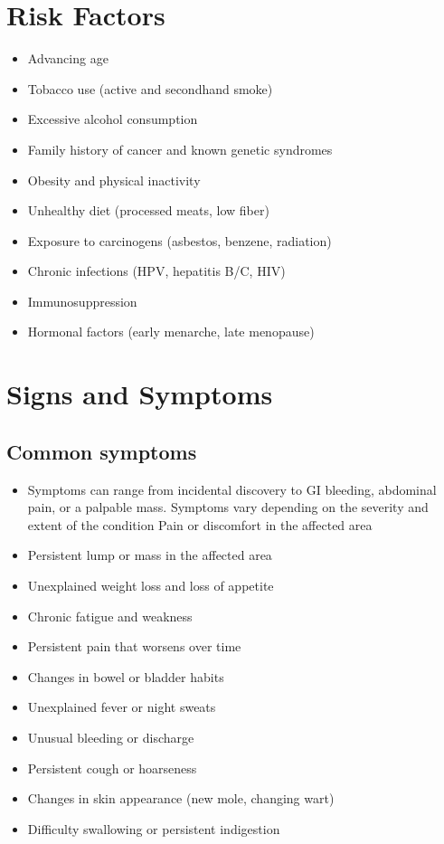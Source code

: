 \section{Risk Factors}

\begin{itemize}[noitemsep]
  \item Advancing age
  \item Tobacco use (active and secondhand smoke)
  \item Excessive alcohol consumption
  \item Family history of cancer and known genetic syndromes
  \item Obesity and physical inactivity
  \item Unhealthy diet (processed meats, low fiber)
  \item Exposure to carcinogens (asbestos, benzene, radiation)
  \item Chronic infections (HPV, hepatitis B/C, HIV)
  \item Immunosuppression
  \item Hormonal factors (early menarche, late menopause)
\end{itemize}
\section{Signs and Symptoms}

\subsection{Common symptoms}
\begin{itemize}[noitemsep]
  \item Symptoms can range from incidental discovery to GI bleeding, abdominal pain, or a palpable mass. Symptoms vary depending on the severity and extent of the condition Pain or discomfort in the affected area
  \item Persistent lump or mass in the affected area
  \item Unexplained weight loss and loss of appetite
  \item Chronic fatigue and weakness
  \item Persistent pain that worsens over time
  \item Changes in bowel or bladder habits
  \item Unexplained fever or night sweats
  \item Unusual bleeding or discharge
  \item Persistent cough or hoarseness
  \item Changes in skin appearance (new mole, changing wart)
  \item Difficulty swallowing or persistent indigestion
\end{itemize}


